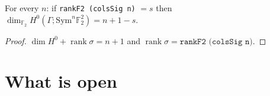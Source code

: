 \begin{theorem}[$h^0$ at $\ell=2$ from one rank]\label{thm:lv-h0-ranks}
  \leanok
  For every $n$: if \texttt{rankF2 (colsSig n)} $=s$ then $\dim_{\mathbb F_2}H^0(\Gamma;\mathrm{Sym}^n\mathbb F_2^2)=n+1-s$.
\end{theorem}
\begin{proof}
  \leanok
  $\dim H^0+\operatorname{rank}\sigma=n+1$ and $\operatorname{rank}\sigma=\texttt{rankF2 (colsSig n)}$.
\end{proof}

\section{What is open}

